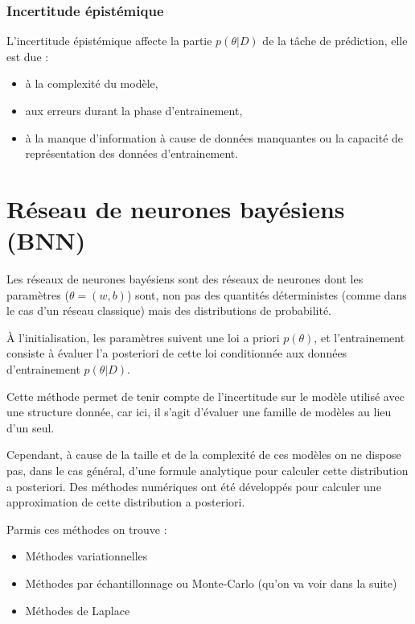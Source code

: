 \documentclass[french,12pt]{article}
\begin{document}
\subsubsection{Incertitude épistémique}

L'incertitude épistémique affecte la partie $p(\theta  | D)$ de la tâche de prédiction,
elle est due :

\begin{itemize}
    \item à la complexité du modèle,
    \item aux erreurs durant la phase d'entrainement,
    \item à la manque d'information à cause de données manquantes
          ou la capacité de représentation des données d'entrainement.
\end{itemize}

\pagebreak

\section{Réseau de neurones bayésiens (BNN)}


Les réseaux de neurones bayésiens sont des réseaux de neurones
dont les paramètres ($\theta = (w, b)$) sont, non pas des quantités déterministes (comme
dans le cas d'un réseau classique) mais des distributions de probabilité.

À l'initialisation, les paramètres suivent une loi a priori $p(\theta)$,
et l'entrainement consiste à évaluer l'a posteriori de cette loi conditionnée
aux données d'entrainement $p(\theta | D)$.

Cette méthode permet de tenir compte de l'incertitude sur le modèle utilisé
avec une structure donnée, car ici, il s'agit d'évaluer 
une famille de modèles au lieu d'un seul.


Cependant, à cause de la taille et de la complexité de ces modèles
on ne dispose pas, dans le cas général, d'une formule analytique pour 
calculer cette distribution a posteriori. Des méthodes numériques
ont été développés pour calculer une approximation de cette distribution a posteriori.

Parmis ces méthodes on trouve :
\begin{itemize}
    \item Méthodes variationnelles
    \item Méthodes par échantillonnage ou
          Monte-Carlo (qu'on va voir dans la suite)
    \item Méthodes de Laplace
\end{itemize}
\end{document}
